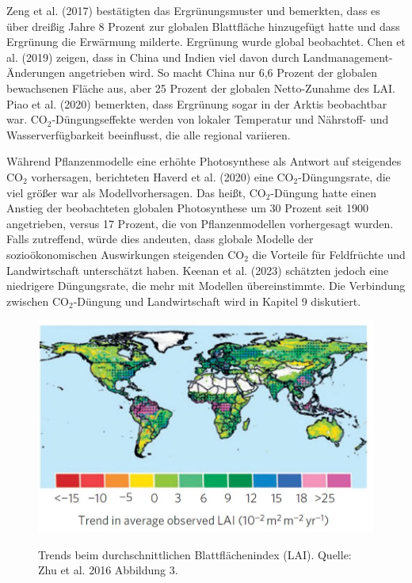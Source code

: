 \documentclass[12pt,paper=a4,DIV=12,parskip=never,chapterprefix=false,headings=standardclasses]{scrreprt}
\numberwithin{figure}{chapter}
\begin{document}
Zeng et al. (2017) bestätigten das Ergrünungsmuster und bemerkten, dass es über dreißig Jahre 8 Prozent zur globalen Blattfläche hinzugefügt hatte und dass Ergrünung die Erwärmung milderte. Ergrünung wurde global beobachtet. Chen et al. (2019) zeigen, dass in China und Indien viel davon durch Landmanagement-Änderungen angetrieben wird. So macht China nur 6,6 Prozent der globalen bewachsenen Fläche aus, aber 25 Prozent der globalen Netto-Zunahme des LAI. Piao et al. (2020) bemerkten, dass Ergrünung sogar in der Arktis beobachtbar war. CO$_2$-Düngungseffekte werden von lokaler Temperatur und Nährstoff- und Wasserverfügbarkeit beeinflusst, die alle regional variieren.

Während Pflanzenmodelle eine erhöhte Photosynthese als Antwort auf steigendes CO$_2$ vorhersagen, berichteten Haverd et al. (2020) eine CO$_2$-Düngungsrate, die viel größer war als Modellvorhersagen. Das heißt, CO$_2$-Düngung hatte einen Anstieg der beobachteten globalen Photosynthese um 30 Prozent seit 1900 angetrieben, versus 17 Prozent, die von Pflanzenmodellen vorhergesagt wurden. Falls zutreffend, würde dies andeuten, dass globale Modelle der sozioökonomischen Auswirkungen steigenden CO$_2$ die Vorteile für Feldfrüchte und Landwirtschaft unterschätzt haben. Keenan et al. (2023) schätzten jedoch eine niedrigere Düngungsrate, die mehr mit Modellen übereinstimmte. Die Verbindung zwischen CO$_2$-Düngung und Landwirtschaft wird in Kapitel 9 diskutiert.

\begin{figure}[H]
\begin{center}
\includegraphics[width=1.0\textwidth]{bilder/bilderKlima-0002.jpg}\\[1cm]
\end{center}
\caption{Trends beim durchschnittlichen Blattflächenindex (LAI). Quelle: Zhu et al. 2016 Abbildung 3.}
\end{figure}
\end{document}
